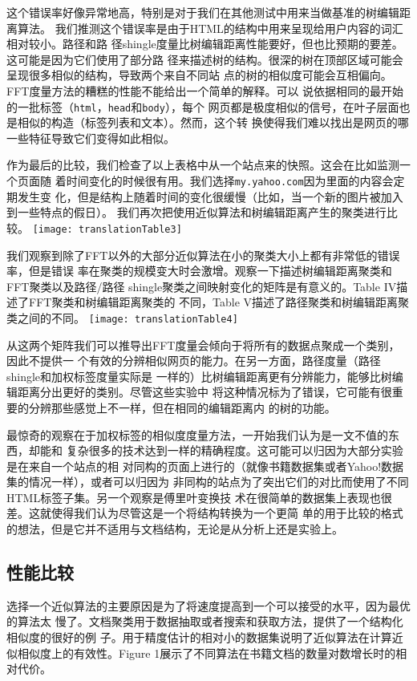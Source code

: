 这个错误率好像异常地高，特别是对于我们在其他测试中用来当做基准的树编辑距离算法。
我们推测这个错误率是由于HTML的结构中用来呈现给用户内容的词汇相对较小。路径和路
径shingle度量比树编辑距离性能要好，但也比预期的要差。这可能是因为它们使用了部分路
径来描述树的结构。很深的树在顶部区域可能会呈现很多相似的结构，导致两个来自不同站
点的树的相似度可能会互相偏向。FFT度量方法的糟糕的性能不能给出一个简单的解释。可以
说依据相同的最开始的一批标签（\texttt{html}，\texttt{head}和\texttt{body}），每个
网页都是极度相似的信号，在叶子层面也是相似的构造（标签列表和文本）。然而，这个转
换使得我们难以找出是网页的哪一些特征导致它们变得如此相似。

作为最后的比较，我们检查了以上表格中从一个站点来的快照。这会在比如监测一个页面随
着时间变化的时候很有用。我们选择\texttt{my.yahoo.com}因为里面的内容会定期发生变
化，但是结构上随着时间的变化很缓慢（比如，当一个新的图片被加入到一些特点的假日）。
我们再次把使用近似算法和树编辑距离产生的聚类进行比较。
{\centering
  \texttt{[image: translationTable3]}
}

我们观察到除了FFT以外的大部分近似算法在小的聚类大小上都有非常低的错误率，但是错误
率在聚类的规模变大时会激增。观察一下描述树编辑距离聚类和FFT聚类以及路径/路径
shingle聚类之间映射变化的矩阵是有意义的。Table IV描述了FFT聚类和树编辑距离聚类的
不同，Table V描述了路径聚类和树编辑距离聚类之间的不同。
{\centering
  \texttt{[image: translationTable4]}
}

从这两个矩阵我们可以推导出FFT度量会倾向于将所有的数据点聚成一个类别，因此不提供一
个有效的分辨相似网页的能力。在另一方面，路径度量（路径shingle和加权标签度量实际是
一样的）比树编辑距离更有分辨能力，能够比树编辑距离分出更好的类别。尽管这些实验中
将这种情况标为了错误，它可能有很重要的分辨那些感觉上不一样，但在相同的编辑距离内
的树的功能。

最惊奇的观察在于加权标签的相似度度量方法，一开始我们认为是一文不值的东西，却能和
复杂很多的技术达到一样的精确程度。这可能可以归因为大部分实验是在来自一个站点的相
对同构的页面上进行的（就像书籍数据集或者Yahoo!数据集的情况一样），或者可以归因为
非同构的站点为了突出它们的对比而使用了不同HTML标签子集。另一个观察是傅里叶变换技
术在很简单的数据集上表现也很差。这就使得我们认为尽管这是一个将结构转换为一个更简
单的用于比较的格式的想法，但是它并不适用与文档结构，无论是从分析上还是实验上。

\subsection{性能比较}
选择一个近似算法的主要原因是为了将速度提高到一个可以接受的水平，因为最优的算法太
慢了。文档聚类用于数据抽取或者搜索和获取方法，提供了一个结构化相似度的很好的例
子。用于精度估计的相对小的数据集说明了近似算法在计算近似相似度上的有效性。Figure
1展示了不同算法在书籍文档的数量对数增长时的相对代价。

